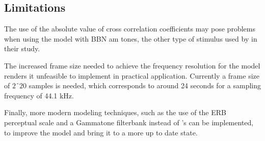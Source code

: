 \documentclass[../main.tex]{subfiles}
\begin{document}
\subsection{Limitations}

The use of the absolute value of cross correlation coefficients may pose
problems when using the model with \gls{BBN} \gls{am} tones, the other type
of stimulus used by \citeauthor{Fastl2007Psychoacoustics} in their study.

The increased frame size needed to achieve the frequency resolution for the
model renders it unfeasible to implement in practical application. Currently
a frame size of $2ˆ20$ samples is needed, which corresponds to around 24 seconds
for a sampling frequency of 44.1 kHz.

Finally, more modern modeling techniques, such as the use of the ERB perceptual
scale and a Gammatone filterbank instead of \citeauthor{Terhardt1979}'s can be
implemented, to improve the model and bring it to a more up to date state.
\end{document}
